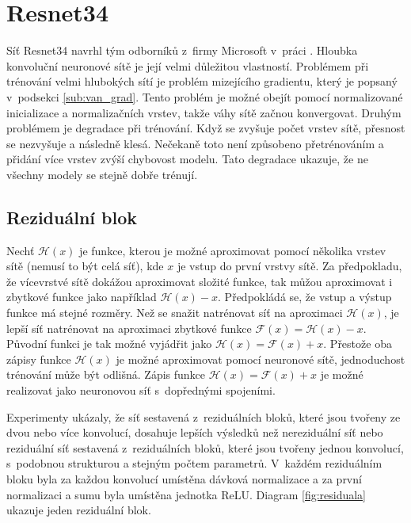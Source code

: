 \section{Resnet34}
\label{sec:resnet34}

Síť Resnet34 navrhl tým odborníků z~firmy Microsoft v~práci \cite{Kaiming2015}.
Hloubka konvoluční neuronové sítě je její velmi důležitou vlastností.
Problémem při trénování velmi hlubokých sítí je problém mizejícího gradientu, který je popsaný v~podsekci \ref{sub:van_grad}.
Tento problém je možné obejít pomocí normalizované inicializace a normalizačních vrstev, takže váhy sítě začnou konvergovat.
Druhým problémem je degradace při trénování.
Když se zvyšuje počet vrstev sítě, přesnost se nezvyšuje a následně klesá.
Nečekaně toto není způsobeno přetrénováním a přidání více vrstev zvýší chybovost modelu.
Tato degradace ukazuje, že ne všechny modely se stejně dobře trénují.

\subsection{Reziduální blok}
\label{sub:residual_block}

Nechť $\mathcal{H}(x)$ je funkce, kterou je možné aproximovat pomocí několika vrstev sítě (nemusí to být celá síť), kde $x$ je vstup do první vrstvy sítě.
Za předpokladu, že vícevrstvé sítě dokážou aproximovat složité funkce, tak můžou aproximovat i zbytkové funkce jako například $\mathcal{H}(x)-x$.
Předpokládá se, že vstup a výstup funkce má stejné rozměry.
Než se snažit natrénovat síť na aproximaci $\mathcal{H}(x)$, je lepší síť natrénovat na aproximaci zbytkové funkce $\mathcal{F}(x)=\mathcal{H}(x)-x$.
Původní funkci je tak možné vyjádřit jako $\mathcal{H}(x)=\mathcal{F}(x)+x$.
Přestože oba zápisy funkce $\mathcal{H}(x)$ je možné aproximovat pomocí neuronové sítě, jednoduchost trénování může být odlišná.
Zápis funkce $\mathcal{H}(x)=\mathcal{F}(x)+x$ je možné realizovat jako neuronovou síť s~dopřednými spojeními.

Experimenty ukázaly, že síť sestavená z~reziduálních bloků, které jsou tvořeny ze dvou nebo více konvolucí, dosahuje lepších výsledků než nereziduální síť nebo reziduální síť sestavená z~reziduálních bloků, které jsou tvořeny jednou konvolucí, s~podobnou strukturou a stejným počtem parametrů.
V~každém reziduálním bloku byla za každou konvolucí umístěna dávková normalizace a za první normalizaci a sumu byla umístěna jednotka ReLU.
Diagram \ref{fig:residuala} ukazuje jeden reziduální blok.

